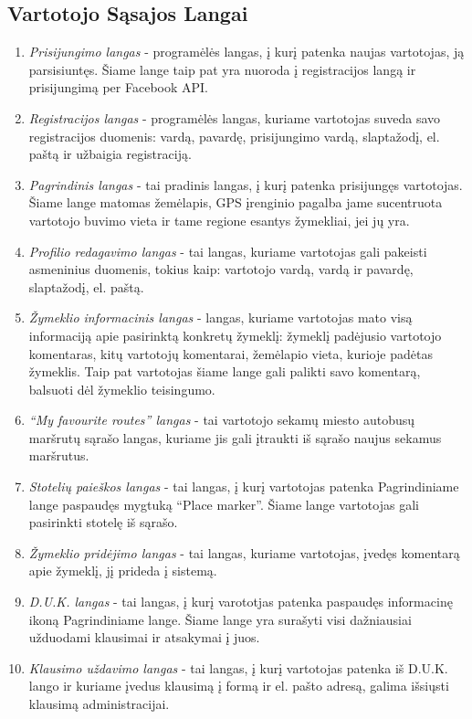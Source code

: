 \documentclass{VUMIFPSkursinis}
\begin{document}
\subsection{Vartotojo Sąsajos Langai}
				\begin{enumerate}[label=VSL\arabic*,itemsep=-2mm]
					\item \textit{Prisijungimo langas} - programėlės langas, į kurį patenka naujas vartotojas, ją parsisiuntęs. Šiame lange taip pat yra nuoroda į registracijos langą ir prisijungimą per Facebook API.
					\item \textit{Registracijos langas} - programėlės langas, kuriame vartotojas suveda savo registracijos duomenis: vardą, pavardę, prisijungimo vardą, slaptažodį, el. paštą ir užbaigia registraciją.
					\item \textit{Pagrindinis langas} - tai pradinis langas, į kurį patenka prisijungęs vartotojas. Šiame lange matomas žemėlapis, GPS įrenginio pagalba jame sucentruota vartotojo buvimo vieta ir tame regione esantys žymekliai, jei jų yra.
					\item \textit{Profilio redagavimo langas} - tai langas, kuriame vartotojas gali pakeisti asmeninius duomenis, tokius kaip: vartotojo vardą, vardą ir pavardę, slaptažodį, el. paštą.
					\item \textit{Žymeklio informacinis langas} - langas, kuriame vartotojas mato visą informaciją apie pasirinktą konkretų žymeklį: žymeklį padėjusio vartotojo komentaras, kitų vartotojų komentarai, žemėlapio vieta, kurioje padėtas žymeklis. Taip pat vartotojas šiame lange gali palikti savo komentarą, balsuoti dėl žymeklio teisingumo. 
					\item \textit{“My favourite routes” langas} - tai vartotojo sekamų miesto autobusų maršrutų sąrašo langas, kuriame jis gali įtraukti iš sąrašo naujus sekamus maršrutus.
					\item \textit{Stotelių paieškos langas} - tai langas, į kurį vartotojas patenka Pagrindiniame lange paspaudęs mygtuką “Place marker”. Šiame lange vartotojas gali pasirinkti stotelę iš sąrašo.
					\item \textit{Žymeklio pridėjimo langas} -  tai langas, kuriame vartotojas, įvedęs komentarą apie žymeklį, jį prideda į sistemą.
					\item \textit{D.U.K. langas} - tai langas, į kurį varototjas patenka paspaudęs informacinę ikoną Pagrindiniame lange. Šiame lange yra surašyti visi dažniausiai užduodami klausimai ir atsakymai į juos.
					\item \textit{Klausimo uždavimo langas} - tai langas, į kurį vartotojas patenka iš D.U.K. lango ir kuriame įvedus klausimą į formą ir el. pašto adresą, galima išsiųsti klausimą administracijai.
				\end{enumerate}
\end{document}
